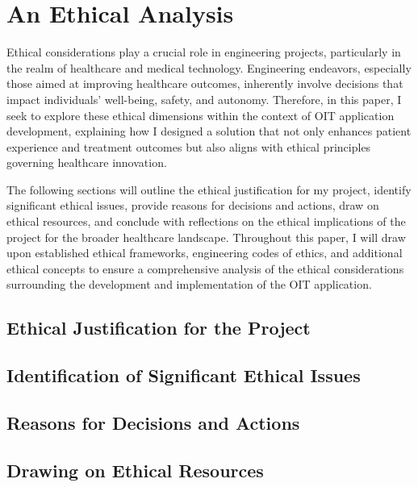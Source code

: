 \chapter{An Ethical Analysis}
\label{section:ethics}

Ethical considerations play a crucial role in engineering projects, particularly in the realm of healthcare and medical technology. Engineering endeavors, especially those aimed at improving healthcare outcomes, inherently involve decisions that impact individuals' well-being, safety, and autonomy. Therefore, in this paper, I seek to explore these ethical dimensions within the context of OIT application development, explaining how I designed a solution that not only enhances patient experience and treatment outcomes but also aligns with ethical principles governing healthcare innovation.

The following sections will outline the ethical justification for my project, identify significant ethical issues, provide reasons for decisions and actions, draw on ethical resources, and conclude with reflections on the ethical implications of the project for the broader healthcare landscape. Throughout this paper, I will draw upon established ethical frameworks, engineering codes of ethics, and additional ethical concepts to ensure a comprehensive analysis of the ethical considerations surrounding the development and implementation of the OIT application.

\section{Ethical Justification for the Project}

\section{Identification of Significant Ethical Issues}

\section{Reasons for Decisions and Actions}

\section{Drawing on Ethical Resources}
